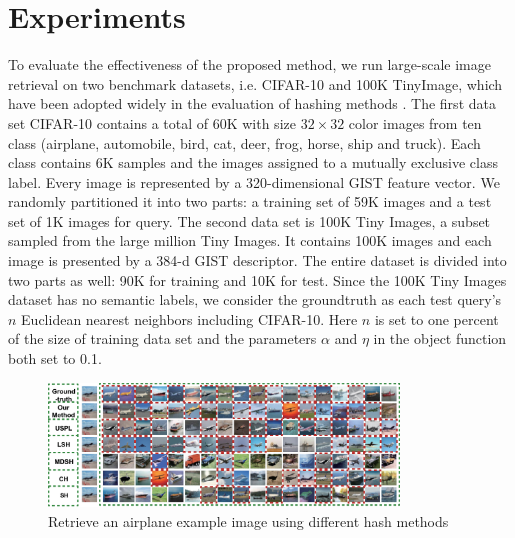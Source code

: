\documentclass{sig-alternate}
\begin{document}
\section{Experiments}
To evaluate the effectiveness of the proposed method, we run large-scale image retrieval on two benchmark datasets, i.e. CIFAR-10 and 100K TinyImage, which have been adopted widely in the evaluation of hashing methods \cite{DBLP:WangKC10-16,DBLP:nipsKulisD09-06,DBLP:cvprLiuWJJC12-07,DBLP:eccvWeissFT12-10,DBLP:cvprGongL11-11}. The first data set CIFAR-10 contains a total of 60K with size $32\times32$ color images from ten class (airplane, automobile, bird, cat, deer, frog, horse, ship and truck). Each class contains 6K samples and the images assigned to a mutually exclusive class label. Every image is represented by a 320-dimensional GIST feature vector. We randomly partitioned it into two parts: a training set of 59K images and a test set of 1K images for query. The second data set is 100K Tiny Images, a subset sampled from the large million Tiny Images. It contains 100K images and each image is presented by a 384-d GIST descriptor. The entire dataset is divided into two parts as well: 90K for training and 10K for test. Since the 100K Tiny Images dataset has no semantic labels, we consider the groundtruth as each test query's $n$ Euclidean nearest neighbors including CIFAR-10. Here $n$ is set to one percent of the size of training data set and the parameters $\alpha$ and $\eta$ in the object function both set to 0.1.
\begin{figure}[!htb]
\centering
\includegraphics[width=0.83\textwidth]{images/image_rereieve_examples.eps}
\caption{Retrieve an airplane example image using different hash methods}
\label{figexample}
\end{figure}
\end{document}
